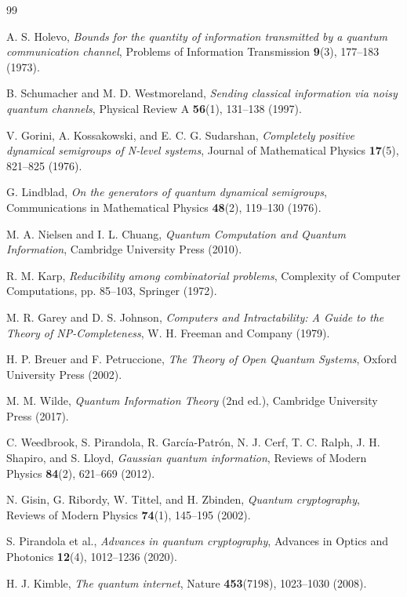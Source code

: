 \documentclass[12pt,a4paper]{article}
\begin{document}
\begin{thebibliography}{99}

A. S. Holevo,
\textit{Bounds for the quantity of information transmitted by a quantum communication channel},
Problems of Information Transmission \textbf{9}(3), 177--183 (1973).

B. Schumacher and M. D. Westmoreland,
\textit{Sending classical information via noisy quantum channels},
Physical Review A \textbf{56}(1), 131--138 (1997).

V. Gorini, A. Kossakowski, and E. C. G. Sudarshan,
\textit{Completely positive dynamical semigroups of N-level systems},
Journal of Mathematical Physics \textbf{17}(5), 821--825 (1976).

G. Lindblad,
\textit{On the generators of quantum dynamical semigroups},
Communications in Mathematical Physics \textbf{48}(2), 119--130 (1976).

M. A. Nielsen and I. L. Chuang,
\textit{Quantum Computation and Quantum Information},
Cambridge University Press (2010).

R. M. Karp,
\textit{Reducibility among combinatorial problems},
Complexity of Computer Computations, pp. 85--103, Springer (1972).

M. R. Garey and D. S. Johnson,
\textit{Computers and Intractability: A Guide to the Theory of NP-Completeness},
W. H. Freeman and Company (1979).

H. P. Breuer and F. Petruccione,
\textit{The Theory of Open Quantum Systems},
Oxford University Press (2002).

M. M. Wilde,
\textit{Quantum Information Theory} (2nd ed.),
Cambridge University Press (2017).

C. Weedbrook, S. Pirandola, R. García-Patrón, N. J. Cerf, T. C. Ralph, J. H. Shapiro, and S. Lloyd,
\textit{Gaussian quantum information},
Reviews of Modern Physics \textbf{84}(2), 621--669 (2012).

N. Gisin, G. Ribordy, W. Tittel, and H. Zbinden,
\textit{Quantum cryptography},
Reviews of Modern Physics \textbf{74}(1), 145--195 (2002).

S. Pirandola et al.,
\textit{Advances in quantum cryptography},
Advances in Optics and Photonics \textbf{12}(4), 1012--1236 (2020).

H. J. Kimble,
\textit{The quantum internet},
Nature \textbf{453}(7198), 1023--1030 (2008).


\end{thebibliography}
\end{document}
